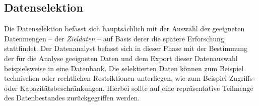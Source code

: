 \subsection{Datenselektion}
\label{selektion}
Die Datenselektion befasst sich hauptsächlich mit der Auswahl der geeigneten Datenmengen -- der \textit{Zieldaten} -- auf Basis derer die spätere Erforschung stattfindet. Der Datenanalyst befasst sich in dieser Phase mit der Bestimmung der für die Analyse geeigneten Daten und dem Export dieser Datenauswahl beispielsweise in eine Datenbank. Die selektierten Daten können zum Beispiel technischen oder rechtlichen Restriktionen unterliegen, wie zum Beispiel Zugriffs- oder Kapazitätsbeschränkungen. Hierbei sollte auf eine repräsentative Teilmenge des Datenbestandes zurückgegriffen werden.